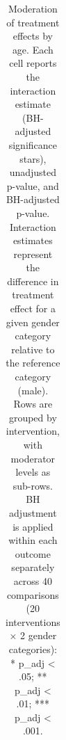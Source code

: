 \documentclass[
  letterpaper,
  DIV=11,
  numbers=noendperiod]{scrartcl}
\begin{document}
\begingroup
\fontsize{7.5pt}{9.0pt}\selectfont
\setlength{\LTpost}{0mm}

\begin{longtable}{l|l}

\caption{\label{tbl-age-secondary-outcomes}Moderation of treatment
effects by age. Each cell reports the interaction estimate (BH-adjusted
significance stars), unadjusted p-value, and BH-adjusted p-value.
Interaction estimates represent the difference in treatment effect for a
given gender category relative to the reference category (male). Rows
are grouped by intervention, with moderator levels as sub-rows. BH
adjustment is applied within each outcome separately across 40
comparisons (20 interventions × 2 gender categories): * p\_adj
\textless{} .05; ** p\_adj \textless{} .01; *** p\_adj \textless{}
.001.}

\tabularnewline


\end{longtable}
\end{document}
